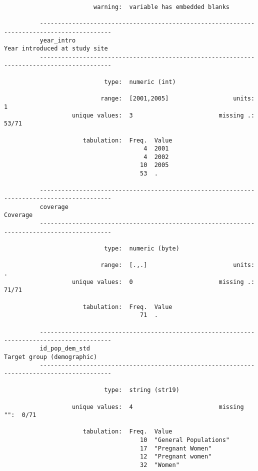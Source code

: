 \documentclass{article}
\begin{document}
\begin{verbatim}
                         warning:  variable has embedded blanks
          
          ------------------------------------------------------------------------------------------
          year_intro                                                   Year introduced at study site
          ------------------------------------------------------------------------------------------
          
                            type:  numeric (int)
          
                           range:  [2001,2005]                  units:  1
                   unique values:  3                        missing .:  53/71
          
                      tabulation:  Freq.  Value
                                       4  2001
                                       4  2002
                                      10  2005
                                      53  .
          
          ------------------------------------------------------------------------------------------
          coverage                                                                          Coverage
          ------------------------------------------------------------------------------------------
          
                            type:  numeric (byte)
          
                           range:  [.,.]                        units:  .
                   unique values:  0                        missing .:  71/71
          
                      tabulation:  Freq.  Value
                                      71  .
          
          ------------------------------------------------------------------------------------------
          id_pop_dem_std                                                  Target group (demographic)
          ------------------------------------------------------------------------------------------
          
                            type:  string (str19)
          
                   unique values:  4                        missing "":  0/71
          
                      tabulation:  Freq.  Value
                                      10  "General Populations"
                                      17  "Pregnant Women"
                                      12  "Pregnant women"
                                      32  "Women"
          

\end{verbatim}
\end{document}
